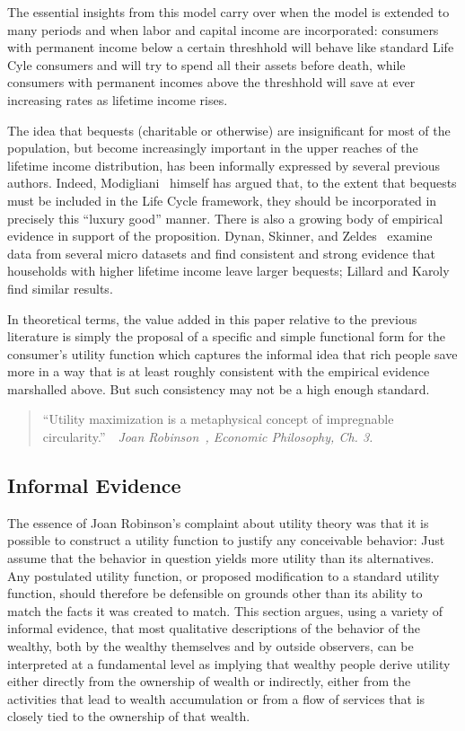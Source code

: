 \documentclass[titlepage,12pt]{article}
\begin{document}
The essential insights from this model carry over when the model is 
extended to many periods and when labor and capital income are 
incorporated: consumers with permanent income below a certain 
threshhold will behave like standard Life Cyle consumers and will try 
to spend all their assets before death, while consumers with permanent 
incomes above the threshhold will save at ever increasing rates as 
lifetime income rises.

The idea that bequests (charitable or otherwise) are insignificant for 
most of the population, but become increasingly important in the upper 
reaches of the lifetime income distribution, has been informally 
expressed by several previous authors.  Indeed, 
Modigliani~\cite{modigliani:nobel} himself has argued that, to the 
extent that bequests must be included in the Life Cycle framework, 
they should be incorporated in precisely this ``luxury good'' manner.  
There is also a growing body of empirical evidence in support 
of the proposition.  Dynan, Skinner, and Zeldes~\cite{dsz:richsave} 
examine data from several micro datasets and find consistent and 
strong evidence that households with higher lifetime income leave 
larger bequests; Lillard and Karoly~\cite{lillard&karoly:richsave} 
find similar results.

In theoretical terms, the value added in this paper relative to the 
previous literature is simply the proposal of a specific and simple 
functional form for the consumer's utility function which captures the 
informal idea that rich people save more in a way that is at least 
roughly consistent with the empirical evidence marshalled above.  But 
such consistency may not be a high enough standard.

\begin{quote}
``Utility maximization is a metaphysical concept of impregnable 
circularity.''~~\emph{Joan Robinson~\cite{robinson:philosophy}, Economic 
Philosophy, Ch. 3.}
\end{quote}

\hypertarget{informal-evidence}{}
\subsection{Informal Evidence}
\label{subsec:InformalEv}
The essence of Joan Robinson's complaint about utility theory was that 
it is possible to construct a utility function to justify any 
conceivable behavior: Just assume that the behavior in question yields 
more utility than its alternatives.  Any postulated utility function, 
or proposed modification to a standard utility function, should 
therefore be defensible on grounds other than its ability to match the 
facts it was created to match.  This section argues, using a variety 
of informal evidence, that most qualitative descriptions of the 
behavior of the wealthy, both by the wealthy themselves and by outside 
observers, can be interpreted at a fundamental level as implying that 
wealthy people derive utility either directly from the ownership of 
wealth or indirectly, either from the activities that lead to wealth 
accumulation or from a flow of services that is closely tied to the 
ownership of that wealth.
\end{document}
